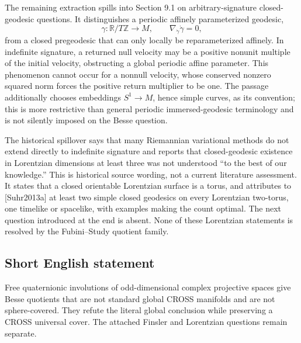 \documentclass[11pt]{article}
\newcommand{\Z}{\mathbb{Z}}
\newcommand{\R}{\mathbb{R}}
\begin{document}
The remaining extraction spills into Section 9.1 on arbitrary-signature closed-geodesic questions. It distinguishes a periodic affinely parameterized geodesic,
\[
 \gamma:\R/T\Z\to M,\qquad\nabla_{\dot\gamma}\dot\gamma=0,
\]
from a closed pregeodesic that can only locally be reparameterized affinely. In indefinite signature, a returned null velocity may be a positive nonunit multiple of the initial velocity, obstructing a global periodic affine parameter. This phenomenon cannot occur for a nonnull velocity, whose conserved nonzero squared norm forces the positive return multiplier to be one. The passage additionally chooses embeddings \(S^1\to M\), hence simple curves, as its convention; this is more restrictive than general periodic immersed-geodesic terminology and is not silently imposed on the Besse question.

The historical spillover says that many Riemannian variational methods do not extend directly to indefinite signature and reports that closed-geodesic existence in Lorentzian dimensions at least three was not understood ``to the best of our knowledge.'' This is historical source wording, not a current literature assessment. It states that a closed orientable Lorentzian surface is a torus, and attributes to [Suhr2013a] at least two simple closed geodesics on every Lorentzian two-torus, one timelike or spacelike, with examples making the count optimal. The next question introduced at the end is absent. None of these Lorentzian statements is resolved by the Fubini--Study quotient family.
\subsection{Short English statement}
Free quaternionic involutions of odd-dimensional complex projective spaces give Besse quotients that are not standard global CROSS manifolds and are not sphere-covered. They refute the literal global conclusion while preserving a CROSS universal cover. The attached Finsler and Lorentzian questions remain separate.
\end{document}
